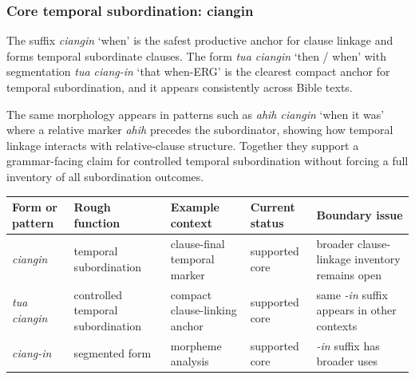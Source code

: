 \documentclass[
  11pt,
  a4paper,
]{article}
\newcounter{none} %
\newcommand{\tdim}[1]{\textit{#1}}
\newcommand{\glossquote}[1]{`#1'}
\begin{document}
\subsubsection{Core temporal subordination:
ciangin}\label{core-temporal-subordination-ciangin}

The suffix \tdim{ciangin} \glossquote{when} is the safest productive
anchor for clause linkage and forms temporal subordinate clauses. The
form \tdim{tua ciangin} \glossquote{then / when} with segmentation
\tdim{tua ciang-in} \glossquote{that when-ERG} is the clearest compact
anchor for temporal subordination, and it appears consistently across
Bible texts.

The same morphology appears in patterns such as \tdim{ahih ciangin}
\glossquote{when it was} where a relative marker \tdim{ahih} precedes
the subordinator, showing how temporal linkage interacts with
relative-clause structure. Together they support a grammar-facing claim
for controlled temporal subordination without forcing a full inventory
of all subordination outcomes.

{\def\LTcaptype{none} %
\begin{longtable}[]{@{}
  >{\raggedright\arraybackslash}p{}
  >{\raggedright\arraybackslash}p{}
  >{\raggedright\arraybackslash}p{}
  >{\raggedright\arraybackslash}p{}
  >{\raggedright\arraybackslash}p{}@{}}
\toprule\noalign{}
\begin{minipage}[b]{\linewidth}\raggedright
Form or pattern
\end{minipage} & \begin{minipage}[b]{\linewidth}\raggedright
Rough function
\end{minipage} & \begin{minipage}[b]{\linewidth}\raggedright
Example context
\end{minipage} & \begin{minipage}[b]{\linewidth}\raggedright
Current status
\end{minipage} & \begin{minipage}[b]{\linewidth}\raggedright
Boundary issue
\end{minipage} \\
\midrule\noalign{}
\endhead
\bottomrule\noalign{}
\endlastfoot
\tdim{ciangin} & temporal subordination & clause-final temporal marker &
supported core & broader clause-linkage inventory remains open \\
\tdim{tua ciangin} & controlled temporal subordination & compact
clause-linking anchor & supported core & same \tdim{-in} suffix appears
in other contexts \\
\tdim{ciang-in} & segmented form & morpheme analysis & supported core &
\tdim{-in} suffix has broader uses \\
\end{longtable}
}
\end{document}
